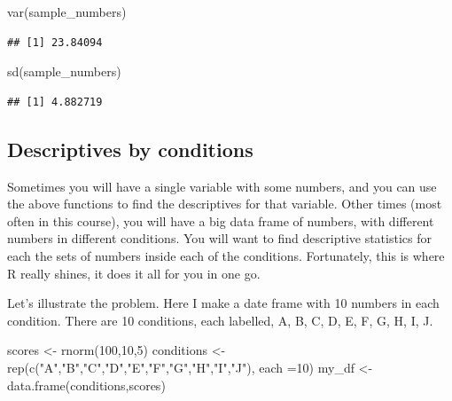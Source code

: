 \documentclass[
]{book}
\newenvironment{Shaded}{\begin{snugshade}}{\end{snugshade}}
\newcommand{\AttributeTok}[1]{\textcolor[rgb]{0.77,0.63,0.00}{#1}}
\newcommand{\DecValTok}[1]{\textcolor[rgb]{0.00,0.00,0.81}{#1}}
\newcommand{\FunctionTok}[1]{\textcolor[rgb]{0.00,0.00,0.00}{#1}}
\newcommand{\NormalTok}[1]{#1}
\newcommand{\OtherTok}[1]{\textcolor[rgb]{0.56,0.35,0.01}{#1}}
\newcommand{\StringTok}[1]{\textcolor[rgb]{0.31,0.60,0.02}{#1}}
\begin{document}
\begin{Shaded}
\begin{Highlighting}[]
\FunctionTok{var}\NormalTok{(sample\_numbers)}
\end{Highlighting}
\end{Shaded}

\begin{verbatim}
## [1] 23.84094
\end{verbatim}

\begin{Shaded}
\begin{Highlighting}[]
\FunctionTok{sd}\NormalTok{(sample\_numbers)}
\end{Highlighting}
\end{Shaded}

\begin{verbatim}
## [1] 4.882719
\end{verbatim}

\hypertarget{descriptives-by-conditions}{%
\subsection{Descriptives by conditions}\label{descriptives-by-conditions}}

Sometimes you will have a single variable with some numbers, and you can use the above functions to find the descriptives for that variable. Other times (most often in this course), you will have a big data frame of numbers, with different numbers in different conditions. You will want to find descriptive statistics for each the sets of numbers inside each of the conditions. Fortunately, this is where R really shines, it does it all for you in one go.

Let's illustrate the problem. Here I make a date frame with 10 numbers in each condition. There are 10 conditions, each labelled, A, B, C, D, E, F, G, H, I, J.

\begin{Shaded}
\begin{Highlighting}[]
\NormalTok{scores }\OtherTok{\textless{}{-}} \FunctionTok{rnorm}\NormalTok{(}\DecValTok{100}\NormalTok{,}\DecValTok{10}\NormalTok{,}\DecValTok{5}\NormalTok{)}
\NormalTok{conditions }\OtherTok{\textless{}{-}} \FunctionTok{rep}\NormalTok{(}\FunctionTok{c}\NormalTok{(}\StringTok{"A"}\NormalTok{,}\StringTok{"B"}\NormalTok{,}\StringTok{"C"}\NormalTok{,}\StringTok{"D"}\NormalTok{,}\StringTok{"E"}\NormalTok{,}\StringTok{"F"}\NormalTok{,}\StringTok{"G"}\NormalTok{,}\StringTok{"H"}\NormalTok{,}\StringTok{"I"}\NormalTok{,}\StringTok{"J"}\NormalTok{), }\AttributeTok{each =}\DecValTok{10}\NormalTok{)}
\NormalTok{my\_df }\OtherTok{\textless{}{-}} \FunctionTok{data.frame}\NormalTok{(conditions,scores)}
\end{Highlighting}
\end{Shaded}
\end{document}
